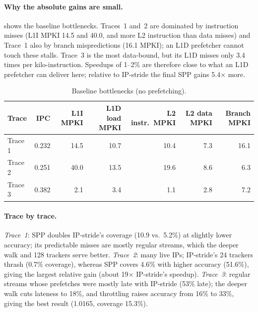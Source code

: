 \documentclass[12pt, a4paper]{article}
\newcommand{\tablesetup}{\small\renewcommand{\arraystretch}{1.15}\setlength{\tabcolsep}{4pt}}
\newcommand{\colhead}[1]{\textbf{#1}}
\begin{document}
\paragraph{Why the absolute gains are small.}  shows the
baseline bottlenecks. Traces~1 and~2 are dominated by instruction misses
(L1I MPKI 14.5 and 40.0, and more L2 instruction than data misses) and
Trace~1 also by branch mispredictions (16.1 MPKI); an L1D prefetcher cannot
touch these stalls. Trace~3 is the most data-bound, but its L1D misses only
3.4 times per kilo-instruction. Speedups of 1--2\% are therefore close to what
an L1D prefetcher can deliver here; relative to IP-stride the final SPP gains
5.4$\times$ more.

\begin{table}[htbp]
\centering
\caption{Baseline bottlenecks (no prefetching).}\label{tab:frontend}
\tablesetup\footnotesize
\begin{tabular}{lrrrrrr}
\toprule
\rowcolor{tablehead}\colhead{Trace} & \colhead{IPC} & \colhead{L1I MPKI} & \colhead{L1D load MPKI} & \colhead{L2 instr.\ MPKI} & \colhead{L2 data MPKI} & \colhead{Branch MPKI} \\
\midrule
Trace 1 & 0.232 & 14.5 & 10.7 & 10.4 & 7.3 & 16.1 \\
Trace 2 & 0.251 & 40.0 & 13.5 & 19.6 & 8.6 & 6.3 \\
Trace 3 & 0.382 & 2.1 & 3.4 & 1.1 & 2.8 & 7.2 \\
\bottomrule
\end{tabular}
\end{table}

\paragraph{Trace by trace.} \emph{Trace~1}: SPP doubles IP-stride's coverage
(10.9 vs.\ 5.2\%) at slightly lower accuracy; its predictable misses are mostly
regular streams, which the deeper walk and 128 trackers serve better.
\emph{Trace~2}: many live IPs; IP-stride's 24 trackers thrash (0.7\% coverage),
whereas SPP covers 4.6\% with higher accuracy (51.6\%), giving the largest
relative gain (about 19$\times$ IP-stride's speedup). \emph{Trace~3}: regular streams
whose prefetches were mostly late with IP-stride (53\% late); the deeper walk
cuts lateness to 18\%, and throttling raises accuracy from 16\% to 33\%,
giving the best result (1.0165, coverage 15.3\%).
\end{document}
